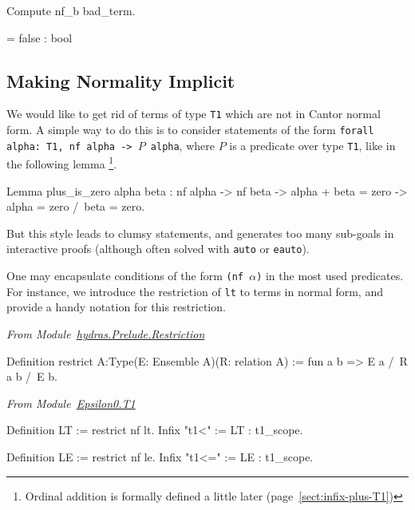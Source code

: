 \begin{Coqsrc}
 Compute nf_b bad_term.
\end{Coqsrc}

\begin{Coqanswer}
   = false 
     : bool
\end{Coqanswer}



\subsection{Making Normality Implicit}
  We would like to get rid of terms of type \texttt{T1} which are not in Cantor normal form.
A simple way to do this is to consider statements of the form 
\texttt{forall alpha: T1, nf alpha -> $P$ alpha}, where $P$ is a predicate over type \texttt{T1}, like in the following lemma \footnote{Ordinal addition is formally defined a little later (page~\ref{sect:infix-plus-T1})}.

\begin{Coqsrc}
Lemma plus_is_zero alpha beta :
  nf alpha -> nf beta ->
  alpha + beta  = zero -> alpha = zero /\  beta = zero.
\end{Coqsrc}

But this style leads to clumsy statements, and generates too many sub-goals in interactive proofs (although often solved with \texttt{auto} or \texttt{eauto}).

One may encapsulate conditions of the form \texttt{(nf $\alpha$)} in
the most used predicates. For instance, we introduce the restriction of \texttt{lt} to terms in normal form, and provide a handy notation for this restriction.

\vspace{4pt}
\emph{From Module~\href{../theories/html/hydras.Prelude.Restriction.html}{hydras.Prelude.Restriction}}

\begin{Coqsrc}
Definition restrict {A:Type}(E: Ensemble A)(R: relation A) :=
    fun a b => E a /\ R a b /\ E b.
 \end{Coqsrc}

 
\vspace{4pt}
\emph{From Module~\href{../theories/html/hydras.Epsilon0.T1.html\#LT}{Epsilon0.T1}}

\begin{Coqsrc}
Definition LT := restrict nf lt.
Infix "t1<" := LT : t1_scope.

Definition LE := restrict nf le.
Infix "t1<=" := LE : t1_scope.
\end{Coqsrc}


